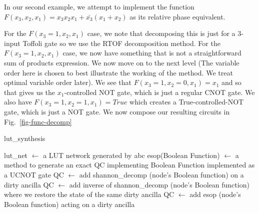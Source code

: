 \begin{example}
  \label{ex-bool}
  In our second example, we attempt to implement the function $F(x_3,x_2,x_1) = x_3x_2x_1 + \bar{x_3}(x_1 + x_2)$ as its relative phase equivalent.

  For the $F(x_3 = 1,x_2,x_1)$ case, we note that decomposing this is just for a 3-input Toffoli gate so we use the RTOF decomposition method. For the $F(x_3 = 1,x_2,x_1)$ case, we now have something that is not a straightforward sum of products expression. We now move on to the next level (The variable order here is chosen to best illustrate the working of the method. We treat optimal variable order later). We see that $F(x_3 = 1,x_2=0,x_1) = x_1$ and so that gives us the $x_1$-controlled NOT gate, which is just a regular CNOT gate. We also have $F(x_3 = 1,x_2=1,x_1) = True$ which creates a True-controlled-NOT gate, which is just a NOT gate. We now compose our resulting circuits in Fig.~\ref{fig-func-decomp} 
\end{example}
\begin{algorithm}[tbp]
  \caption{lut\_synthesis}
  \label{algo-lut}
  \begin{algorithmic}
    \State lut\_net $\leftarrow$ a LUT network generated by abc
    \State esop(Boolean Function) $\leftarrow$ a method to generate an exact QC implementing Boolean Function implemented as a UCNOT gate
    \State QC $\leftarrow$ add shannon\_decomp (node's Boolean function) on a dirty ancilla
    \State QC $\leftarrow$ add inverse of shannon\_decomp (node's 
    Boolean function) where we restore the state of the same dirty ancilla
    \State QC $\leftarrow$ add esop (node's Boolean function) acting on a dirty ancilla
    \EndIf
    \EndFor
  \end{algorithmic}
\end{algorithm}

    


